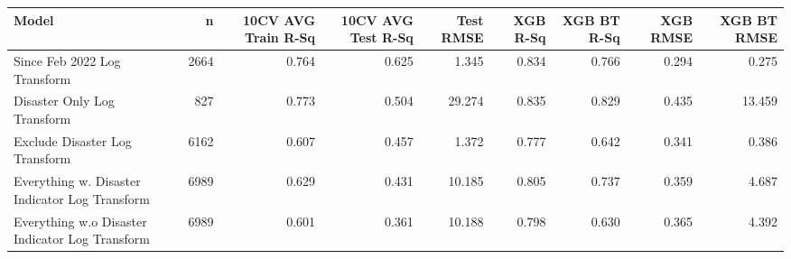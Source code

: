 
\begin{tabular}{l|r|r|r|r|r|r|r|r}
\hline
Model & n & 10CV AVG Train R-Sq & 10CV AVG Test R-Sq & Test RMSE & XGB R-Sq & XGB BT R-Sq & XGB RMSE & XGB BT RMSE\\
\hline
Since Feb 2022 Log Transform & 2664 & 0.764 & 0.625 & 1.345 & 0.834 & 0.766 & 0.294 & 0.275\\
\hline
Disaster Only Log Transform & 827 & 0.773 & 0.504 & 29.274 & 0.835 & 0.829 & 0.435 & 13.459\\
\hline
Exclude Disaster Log Transform & 6162 & 0.607 & 0.457 & 1.372 & 0.777 & 0.642 & 0.341 & 0.386\\
\hline
Everything w. Disaster Indicator Log Transform & 6989 & 0.629 & 0.431 & 10.185 & 0.805 & 0.737 & 0.359 & 4.687\\
\hline
Everything w.o Disaster Indicator Log Transform & 6989 & 0.601 & 0.361 & 10.188 & 0.798 & 0.630 & 0.365 & 4.392\\
\hline
\end{tabular}
